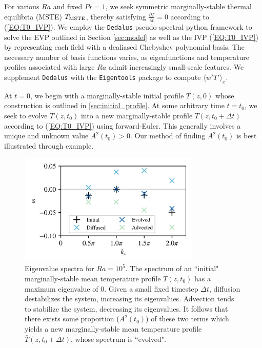 \documentclass[reprint,amsmath,amssymb,aps]{revtex4-1}
\begin{document}
For various $Ra$ and fixed $Pr = 1$, we seek symmetric marginally-stable thermal equilibria (MSTE) $\bar{T}_{\rm{MSTE}}$, thereby satisfying $\frac{\partial \bar{T}}{\partial t} = 0$ according to (\ref{EQ:T0_IVP}). 
We employ the \texttt{Dedalus} pseudo-spectral python framework to solve the EVP outlined in Section \ref{sec:model} as well as the IVP (\ref{EQ:T0_IVP}) by representing each field with a dealiased Chebyshev polynomial basis. 
The necessary number of basis functions varies, as eigenfunctions and temperature profiles associated with large $Ra$ admit increasingly small-scale features. 
We supplement \texttt{Dedalus} with the \texttt{Eigentools} package to compute $\langle w' T' \rangle_x$.

At $t = 0$, we begin with a marginally-stable initial profile $\bar{T}(z, 0)$ whose construction is outlined in \ref{sec:initial_profile}. 
At some arbitrary time $t = t_0$, we seek to evolve $\bar{T}(z, t_0)$ into a new marginally-stable profile $\bar{T}(z, t_0 + \Delta t)$ according to (\ref{EQ:T0_IVP}) using forward-Euler. 
This generally involves a unique and unknown value $A^2(t_0) > 0$. 
Our method of finding $A^2(t_0)$ is best illustrated through example.

\begin{figure}
    \includegraphics[width=3.4in]{EV_spectrum_ol.png}
    \caption{Eigenvalue spectra for $Ra = 10^5$. The spectrum of an ``initial" marginally-stable mean temperature profile $\bar{T}(z, t_0)$ has a maximum eigenvalue of 0. 
    Given a small fixed timestep $\Delta t$, diffusion destabilizes the system, increasing its eigenvalues. 
    Advection tends to stabilize the system, decreasing its eigenvalues. 
    It follows that there exists some proportion ($A^2(t_0)$) of these two terms which yields a new marginally-stable mean temperature profile $\bar{T}(z, t_0 + \Delta t)$, whose spectrum is ``evolved".}
    \label{fig:iteration_spectra} 
\end{figure}
\end{document}
